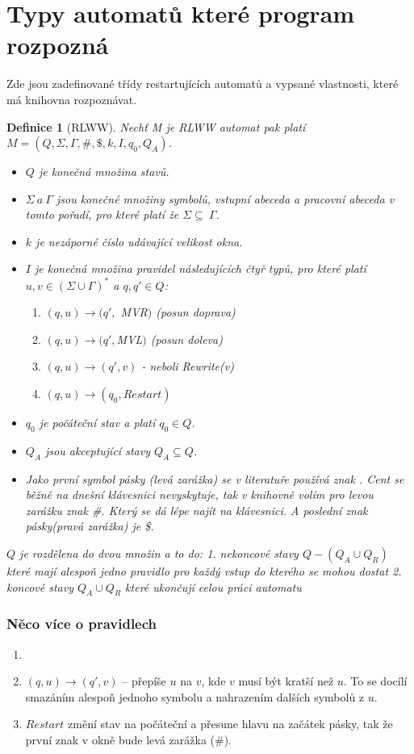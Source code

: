\documentclass{article}
\newtheorem{theorem}{Definice}
\begin{document}
\section{Typy automatů které program rozpozná}
Zde jsou zadefinované třídy restartujících automatů a vypsané vlastnosti, které má knihovna rozpoznávat.

\begin{theorem}[RLWW]
Nechť M je RLWW automat pak platí $M = (Q ,\Sigma, \Gamma, \# , \$, k ,I ,q_0, Q_A)$.
\begin{itemize}
	\item  $Q$ je konečná množina stavů.
	\item  $\Sigma  \ a \ \Gamma$ jsou konečné množiny symbolů,
		vstupní abeceda a pracovní abeceda v tomto pořadí, pro které platí že $\Sigma  \subseteq \ \Gamma$.
	\item  $k$ je nezáporné číslo udávající velikost okna.
	\item  $I$ je konečná množina pravidel následujících čtyř typů, pro které platí $u, v \in (\Sigma \cup \Gamma)^*$ a $q, q' \in Q$:
		\begin{enumerate}
			\item $(q, u) \to (q',$ MVR$)$ (posun doprava)
			\item $(q, u) \to (q', $MVL$)$ (posun doleva)
			\item $(q, u) \to (q', v)$	- neboli Rewrite(v)
			\item $(q, u) \to (q_0, Restart)$
		\end{enumerate}
	\item  $q_0$ je počáteční stav a platí $q_0 \in Q$.
	\item  $Q_A$ jsou akceptující stavy $Q_A \subseteq Q$.
	\item  Jako první symbol pásky (levá zarážka)	se v literatuře používá znak
	 \cent.
	Cent se běžně na dnešní klávesnici nevyskytuje, tak v knihovně volím pro levou zarážku znak \#.
	Který se dá lépe najít na klávesnici.
	A poslední znak pásky(pravá zarážka) je \$.
\end{itemize}

$Q$ je rozdělena do dvou množin a to do:
1. nekoncové stavy $Q - (Q_A \cup Q_R)$ které mají alespoň jedno pravidlo pro každý vstup do kterého se mohou dostat
2. koncové stavy $Q_A \cup Q_R$ které ukončují celou práci automatu
\end{theorem}
\subsubsection{Něco více o pravidlech}
\begin{enumerate}
	\item 
	\item $(q, u)\to(q', v)$ -- přepíše $u$ na $v$, kde $v$ musí být kratší než $u$.
	To se docílí smazáním alespoň jednoho symbolu a nahrazením dalších symbolů z $u$.
	\item  $Restart$ změní stav na počáteční a přesune hlavu na začátek pásky, tak že první znak v okně bude levá zarážka (\#).
\end{enumerate}
\end{document}
